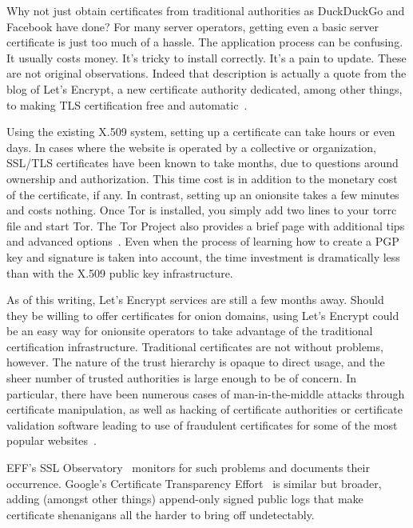 \documentclass[10pt, conference, compsocconf]{styles/IEEEtran}
\begin{document}
Why not just obtain certificates from traditional authorities as
DuckDuckGo and Facebook have done? For many server operators, getting
even a basic server certificate is just too much of a hassle. The
application process can be confusing. It usually costs money. It's
tricky to install correctly. It's a pain to update. 
These are not original observations. Indeed that description is
actually a quote from the blog of Let's Encrypt, a new certificate
authority dedicated, among other things, to making TLS certification
free and automatic~\cite{lets-encrypt}.

Using the existing X.509 system, setting up a certificate can take
hours or even days. In cases where the website is operated by a
collective or organization, SSL/TLS certificates have been known to
take months, due to questions around ownership and authorization.
This time cost is in addition to the monetary cost of the certificate, if any.
In contrast, setting up an onionsite takes a few minutes and costs
nothing. Once Tor is installed, you simply add two lines to your torrc file 
and start Tor. The Tor Project also provides a brief page with
additional tips and advanced options~\cite{hs-config}.  Even when the process
of learning how to create a PGP key and signature is taken into
account, the time investment is dramatically less than with the X.509
public key infrastructure.

As of this writing, Let's Encrypt services are still a few months away.
Should they be willing to offer certificates for onion
domains, using Let's Encrypt could be an easy way for
onionsite operators to take advantage of the traditional certification
infrastructure. 
Traditional certificates are not without problems,
however. The nature of the trust hierarchy is opaque to direct usage,
and the sheer number of trusted authorities is large enough to be of
concern. In particular, there have been numerous cases of
man-in-the-middle attacks through certificate
manipulation, as well as hacking of certificate authorities or
certificate validation software leading to
use of fraudulent certificates for some of the most popular
websites~\cite{forged-ssl-oakland14}.

EFF's SSL Observatory~\cite{ssl-observatory} 
monitors for such problems and documents their occurrence.
Google's Certificate Transparency
Effort~\cite{certificate-transparency} is similar but broader,
adding (amongst other things) append-only signed public
logs that make certificate shenanigans all the harder to bring off
undetectably.
\end{document}
